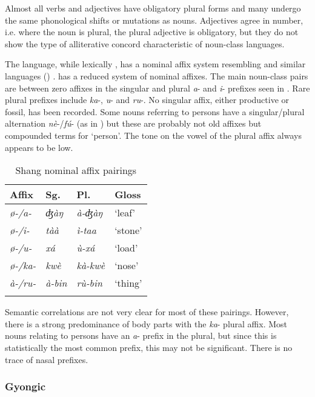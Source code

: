 \documentclass[output=paper]{langsci/langscibook}
\begin{document}
Almost all verbs and adjectives have obligatory plural forms and many undergo the same phonological shifts or mutations as nouns. Adjectives agree in number, i.e. where the noun is plural, the plural adjective is obligatory, but they do not show the type of alliterative concord characteristic of noun-class languages.

The  language, while lexically , has a nominal affix system resembling  and similar  languages () \citet{Blenchn.d.d}.  has a reduced system of nominal affixes. The main noun-class pairs are between zero affixes in the singular and plural \textit{a}- and \textit{i}- prefixes seen in . Rare plural prefixes include \textit{ka}-, \textit{u}- and \textit{ru}-. No singular affix, either productive or fossil, has been recorded. Some nouns referring to persons have a singular/plural alternation \textit{nè}-/\textit{fú}- (as in ) but these are probably not old affixes but compounded terms for ‘person’. The tone on the vowel of the plural affix always appears to be low.

\begin{table}
\caption{\label{tab:nomaffplat:9} Shang nominal affix pairings}
\begin{tabularx}{\textwidth}{XXXl}
\lsptoprule
 Affix 	& {Sg.} 	& {Pl.} 	& Gloss\\
\midrule
\itshape ø-/a- 	& \itshape ʤàŋ 	& \itshape à-ʤàŋ 	& ‘leaf’\\
\itshape ø-/i- 	& \itshape tàà 	& \itshape ì-taa 	& ‘stone’\\
\itshape ø-/u- 	& \itshape xá 	& \itshape ù-xá 	& ‘load’\\
\itshape ø-/ka- 	& \itshape kwè 	& \itshape kà-kwè 	& ‘nose’\\
\itshape à-/ru- 	& \itshape à-bin 	& \itshape rù-bin 	& ‘thing’\\
\lspbottomrule
\end{tabularx}
\end{table}

\largerpage
Semantic correlations are not very clear for most of these pairings. However, there is a strong predominance of body parts with the \textit{ka}- plural affix. Most nouns relating to persons have an \textit{a}- prefix in the plural, but since this is statistically the most common prefix, this may not be significant. There is no trace of nasal prefixes.

\subsubsection{Gyongic} %
\end{document}

